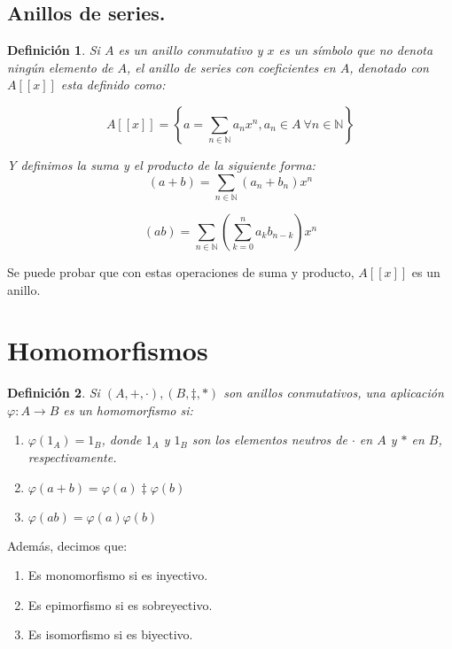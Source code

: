 \documentclass[11pt, a4paper, titlepage]{article}
\newif\IfInSansMode
\theoremstyle{theorem-style}
\theoremstyle{definition-style}
\newtheorem{ndef}{Definición}[section]
\theoremstyle{remark-style}
\theoremstyle{example-style}
\begin{document}
\subsection*{Anillos de series.}
\begin{ndef}
  Si $A$ es un anillo conmutativo y $x$ es un símbolo que no denota ningún elemento de $A$, el anillo de series con coeficientes en $A$, denotado con $A[[x]]$ esta definido como:

\[
    A[[x]] = \left\{a = \displaystyle\sum_{n\in \mathbb{N}} a_n x^n , a_n \in A\ \forall	n \in \mathbb{N}\right\}
\]

Y definimos la suma y el producto de la siguiente forma:\\
\[(a+b) = \sum_{n\in \mathbb{N}}(a_n+b_n)x^n\]

\[ (ab) = \sum_{n\in \mathbb{N}} \left(\sum_{k=0}^n a_k b_{n-k}\right)x^n\]

\end{ndef}

Se puede probar que con estas operaciones de suma y producto, $A[[x]]$ es un anillo.

\section{Homomorfismos}

\begin{ndef}
Si $(A, +, \cdot), (B, \ddagger, \ast)$ son anillos conmutativos, una aplicación $\varphi: A \to B$ es un homomorfismo si:

\begin{enumerate}
	\item $\varphi(1_A) = 1_B$, donde $1_A$ y $1_B$ son los elementos neutros de $\cdot$ en $A$ y $\ast$ en $B$, respectivamente.
	\item $\varphi(a+b) = \varphi(a) \ddagger \varphi(b)$
	\item $\varphi(ab) = \varphi(a)  \varphi(b)$

\end{enumerate}

\end{ndef}

Además, decimos que:

\begin{enumerate}
	\item Es monomorfismo si es inyectivo.
	\item Es epimorfismo si es sobreyectivo.
	\item Es isomorfismo si es biyectivo.
\end{enumerate}
\end{document}
